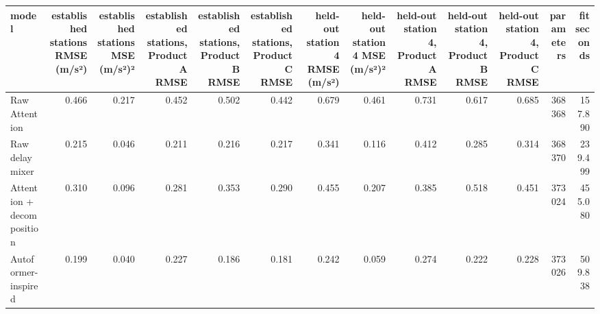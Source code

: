 \begin{tabular}{lrrrrrrrrrrrr}
\toprule
model & established stations RMSE (m/s²) & established stations MSE (m/s²)² & established stations, Product A RMSE & established stations, Product B RMSE & established stations, Product C RMSE & held-out station 4 RMSE (m/s²) & held-out station 4 MSE (m/s²)² & held-out station 4, Product A RMSE & held-out station 4, Product B RMSE & held-out station 4, Product C RMSE & parameters & fit seconds \\
\midrule
Raw Attention & 0.466 & 0.217 & 0.452 & 0.502 & 0.442 & 0.679 & 0.461 & 0.731 & 0.617 & 0.685 & 368368 & 157.890 \\
Raw delay mixer & 0.215 & 0.046 & 0.211 & 0.216 & 0.217 & 0.341 & 0.116 & 0.412 & 0.285 & 0.314 & 368370 & 239.499 \\
Attention + decomposition & 0.310 & 0.096 & 0.281 & 0.353 & 0.290 & 0.455 & 0.207 & 0.385 & 0.518 & 0.451 & 373024 & 455.080 \\
Autoformer-inspired & 0.199 & 0.040 & 0.227 & 0.186 & 0.181 & 0.242 & 0.059 & 0.274 & 0.222 & 0.228 & 373026 & 509.838 \\
\bottomrule
\end{tabular}
